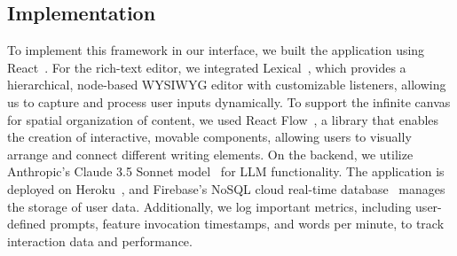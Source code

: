 \subsection{Implementation}
To implement this framework in our interface, we built the application using React~\cite{react}. For the rich-text editor, we integrated Lexical~\cite{lexical}, which provides a hierarchical, node-based WYSIWYG editor with customizable listeners, allowing us to capture and process user inputs dynamically. To support the infinite canvas for spatial organization of content, we used React Flow~\cite{reactflow}, a library that enables the creation of interactive, movable components, allowing users to visually arrange and connect different writing elements. On the backend, we utilize Anthropic's Claude 3.5 Sonnet model~\cite{anthropicclaude} for LLM functionality. The application is deployed on Heroku~\cite{heroku}, and Firebase’s NoSQL cloud real-time database~\cite{firebase} manages the storage of user data. Additionally, we log important metrics, including user-defined prompts, feature invocation timestamps, and words per minute, to track interaction data and performance.
